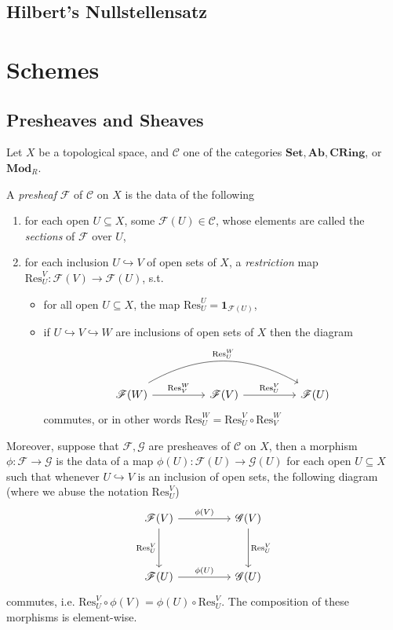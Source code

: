 \documentclass[11pt]{book}
\begin{document}
\section{Hilbert's Nullstellensatz}

\chapter{Schemes}
\section{Presheaves and Sheaves}
Let $X$ be a topological space, and $\mathcal C$ one of the categories $\mathbf{Set},\mathbf{Ab},\mathbf{CRing}$, or $\mathbf {Mod}_R$.
\begin{definition}\label{def:presheaf}A \textit{presheaf} $\mathscr{F}$ of $\mathcal C$ on $X$ is the data of the following
\begin{enumerate}[label=(\roman*)]
	\item for each open $U\subseteq X$, some $\mathscr{F}(U)\in \mathcal C$, whose elements are called the \textit{sections} of $\mathscr{F}$ over $U$,
	\item for each inclusion $U\hookrightarrow V$ of open sets of $X$, a \textit{restriction} map $\mathrm{Res}^V_U:\mathscr{F}(V)\rightarrow\mathscr{F}(U)$, s.t.
	\begin{itemize}
		\item for all open $U\subseteq X$, the map $\mathrm{Res}^U_U=\mathbf 1_{\mathscr{F}(U)}$,
		\item if $U\hookrightarrow V \hookrightarrow W$ are inclusions of open sets of $X$ then the diagram
		\[
		\begin{tikzcd}[sep=huge]
			\mathscr{F}(W) \arrow[r,"\mathrm{Res}^W_V"] \arrow[rr, "\mathrm{Res}^W_U", bend left, shift left=1] & \mathscr{F}(V) \arrow[r,"\mathrm{Res}^V_U"] & \mathscr{F}(U)
		\end{tikzcd}
		\]
		commutes, or in other words $\mathrm{Res}^W_U=\mathrm{Res}^V_U\circ \mathrm{Res}^W_V$
	\end{itemize}
\end{enumerate}
Moreover, suppose that $\mathscr{F},\mathscr{G}$ are presheaves of $\mathcal C$ on $X$, then a morphism $\phi:\mathscr{F}\rightarrow\mathscr{G}$ is the data of a map $\phi(U):\mathscr{F}(U)\rightarrow\mathscr{G}(U)$ for each open $U\subseteq X$ such that whenever $U\hookrightarrow V$ is an inclusion of open sets, the following diagram (where we abuse the notation $\mathrm{Res}^V_U$)
\[
\begin{tikzcd}[sep = huge]
\mathscr{F}(V) \arrow[r, "\phi(V)"] \arrow[d, "\mathrm{Res}^V_U"'] & \mathscr{G}(V) \arrow[d, "\mathrm{Res}^V_U"] \\
\mathscr{F}(U) \arrow[r, "\phi(U)"]                 & \mathscr{G}(U)               
\end{tikzcd}\]
commutes, i.e. $\mathrm{Res}^V_U\circ\phi(V)=\phi(U)\circ\mathrm{Res}^V_U$. The composition of these morphisms is element-wise.
\end{definition}
\end{document}

